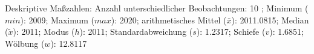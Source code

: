 				\label{tableValues:bstu16_g1}
				\vspace*{-\baselineskip}
                    \begin{noten}
                	    \note{} Deskriptive Maßzahlen:
                	    Anzahl unterschiedlicher Beobachtungen: 10%
                	    ; 
                	      Minimum ($min$): 2009; 
                	      Maximum ($max$): 2020; 
                	      arithmetisches Mittel ($\bar{x}$): \num[round-mode=places,round-precision=2]{2011.0815}; 
                	      Median ($\tilde{x}$): 2011; 
                	      Modus ($h$): 2011; 
                	      Standardabweichung ($s$): \num[round-mode=places,round-precision=2]{1.2317}; 
                	      Schiefe ($v$): \num[round-mode=places,round-precision=2]{1.6851}; 
                	      Wölbung ($w$): \num[round-mode=places,round-precision=2]{12.8117}
                     \end{noten}

